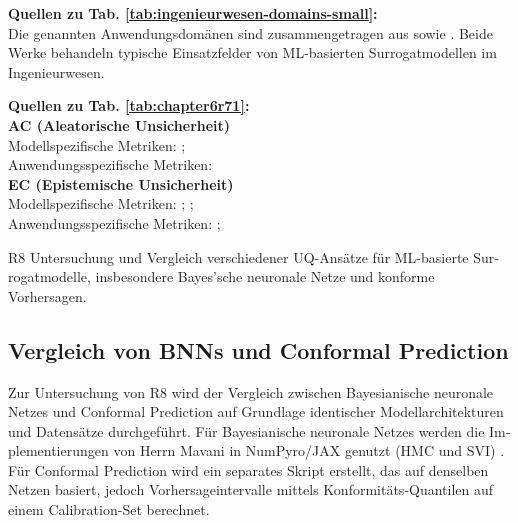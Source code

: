 \begin{otherlanguage}{ngerman}
{\begin{minipage}[t]{\textwidth}
\scriptsize
\textbf{Quellen zu Tab. \ref{tab:ingenieurwesen-domains-small}:}\\[0.5em]
Die genannten Anwendungsdomänen sind zusammengetragen aus \parencite{Gawlikowski2023} sowie \parencite{Ulmer2023}. Beide Werke behandeln typische Einsatzfelder von ML-basierten Surrogatmodellen im Ingenieurwesen. 
\end{minipage}%
\vspace{0.125em}
\begin{minipage}[t]{\textwidth}
\scriptsize
\textbf{Quellen zu Tab. \ref{tab:chapter6r71}:}\\[0.5em]
\textbf{AC (Aleatorische Unsicherheit)}\\
\quad Modellspezifische Metriken: \parencite[S.~224–226]{bishop2006pattern}; \parencite[Kap.~2]{rasmussen2006gaussian} \\
\quad Anwendungsspezifische Metriken: \parencite[S.~40–42]{bishop2006pattern} \\[0.5em]

\textbf{EC (Epistemische Unsicherheit)}\\
\quad Modellspezifische Metriken: \parencite[S.~40–42]{gal2016uncertainty}; \parencite{blundell2015weight}; \parencite{sensoy2018evidential} \\
\quad Anwendungsspezifische Metriken: \parencite[S.~233–235]{bishop2006pattern}; \parencite{ovadia2019can}
\end{minipage}%
}


\pagebreak


R8 Untersuchung und Vergleich verschiedener UQ-Ansätze für ML-basierte Surrogatmodelle, insbesondere Bayes'sche neuronale Netze und konforme Vorhersagen.

\subsection*{Vergleich von BNNs und Conformal Prediction}

Zur Untersuchung von R8 wird der Vergleich zwischen \gls{Bayesianische neuronale Netze}s und \gls{Conformal Prediction} auf Grundlage identischer Modellarchitekturen und Datensätze durchgeführt. Für \gls{Bayesianische neuronale Netze}s werden die Implementierungen von Herrn Mavani in NumPyro/JAX genutzt (HMC und SVI) \parencite{nmavani2025}. Für \gls{Conformal Prediction} wird ein separates Skript erstellt, das auf denselben Netzen basiert, jedoch Vorhersageintervalle mittels Konformitäts-Quantilen auf einem Calibration-Set berechnet.


\end{otherlanguage}
